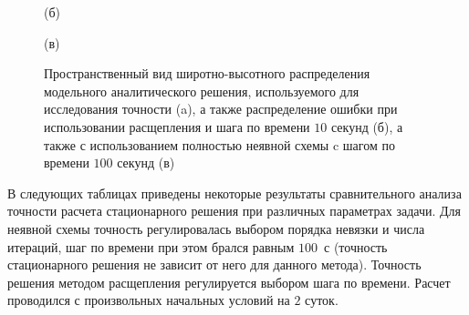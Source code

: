 \documentclass[14pt, a4paper]{extarticle}
\begin{document}
\begin{figure}[H]

(б)


(в)

\caption{Пространственный вид широтно-высотного распределения модельного аналитического решения, используемого для исследования точности (a), а также распределение ошибки при использовании расщепления и шага по времени $10$ секунд (б), а также с использованием полностью неявной схемы c шагом по времени $100$ секунд (в)}
\end{figure}


В следующих таблицах приведены некоторые результаты сравнительного анализа точности расчета стационарного решения при различных параметрах задачи. Для неявной схемы точность регулировалась выбором порядка невязки и числа итераций, шаг по времени при этом брался равным $100$~с (точность стационарного решения не зависит от него для данного метода). Точность решения методом расщепления регулируется выбором шага по времени. Расчет проводился с произвольных начальных условий на $2$ суток.
\end{document}
